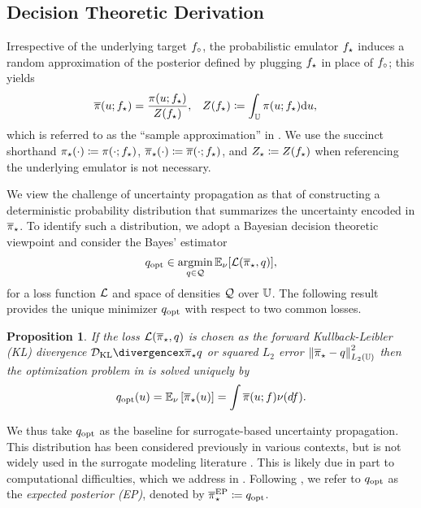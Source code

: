 \documentclass[12pt]{article}
\newtheorem{prop}{Proposition}
\begin{document}
\subsection{Decision Theoretic Derivation} \label{sec:decision-theoretic}
Irrespective of the underlying target $f_{\circ}$, the probabilistic emulator ${f}_{\star}$ 
induces a random approximation of the posterior defined by plugging ${f}_{\star}$
in place of $f_{\circ}$; this yields
\begin{align}
\postDensNorm(\Par; \targetEm) 
&= \frac{\postDens(\Par; \targetEm)}{\normCst(\targetEm)},
&&\normCst(\targetEm) \Def \int_{\parSpace} \postDens(\Par; \targetEm) \d\Par, \label{eq:random-post}
\end{align}
which is referred to as the ``sample approximation'' in \citet{StuartTeck1}. We use the succinct
shorthand ${\pi}_{\star}(\cdot) \coloneqq \pi(\cdot; {f}_{\star})$, 
${\overline{\pi}}_{\star}(\cdot) \coloneqq \overline{\pi}(\cdot; {f}_{\star})$, and 
${Z}_{\star} \coloneqq Z({f}_{\star})$ when referencing the underlying 
emulator is not necessary.

We view the challenge of uncertainty propagation as that of constructing a deterministic 
probability distribution that summarizes the uncertainty encoded in ${\overline{\pi}}_{\star}$.
To identify such a distribution, we adopt a Bayesian decision theoretic viewpoint and consider
the Bayes' estimator
\begin{equation}
q_{\mathrm{opt}} \in \operatorname*{argmin}_{q \in \mathcal{Q}} \mathbb{E}_{\nu}[\mathcal{L}({\overline{\pi}}_{\star}, q)],
\label{eq:variational-opt}
\end{equation}
for a loss function $\mathcal{L}$ and space of densities $\mathcal{Q}$ over $\mathbb{U}$. The following 
result provides the unique minimizer $q_{\mathrm{opt}}$ with respect to two common losses.

\begin{prop} \label{prop:EP-variational}
If the loss $\mathcal{L}({\overline{\pi}}_{\star}, q)$ is chosen as the forward Kullback-Leibler (KL) divergence 
$\KL{\postNormEm}{q}$ or squared $L_2$ error $\left\lVert{\overline{\pi}}_{\star} - q\right\rVert_{L_2(\mathbb{U})}^2$
then the optimization problem in  is solved uniquely by 
\begin{equation}
q_{\mathrm{opt}}(u) = 
\mathbb{E}_{\nu} \left[{\overline{\pi}}_{\star}(u) \right]
= \int \overline{\pi}(u; f) \nu(df).
\label{eq:ep-approx}
\end{equation}
\end{prop}

We thus take $q_{\mathrm{opt}}$ as the baseline for surrogate-based uncertainty propagation. 
This distribution has been considered previously in various 
contexts, but is not widely used in the surrogate modeling literature
\citep{trainDynamics,BurknerSurrogate,garegnani2021NoisyMCMC}.
This is likely due in part to computational difficulties, which we address in .
Following \citet{BurknerSurrogate}, we refer to $q_{\mathrm{opt}}$ as the \textit{expected posterior (EP)},
denoted by ${\overline{\pi}}_{\star}^{\mathrm{EP}} \coloneqq q_{\mathrm{opt}}$.
\end{document}
